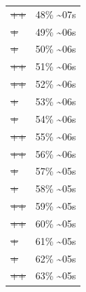 \documentclass[12pt]{article}
\begin{document}
\begin{center}
\begin{tabular}{ll}
\sout{\sout{\sout{\sout{\sout{\sout{\sout{\sout{\sout{\sout{\sout{++}}}}}}}}}}} & 48\% \textasciitilde{}07s\\
\sout{\sout{\sout{\sout{\sout{\sout{\sout{\sout{\sout{\sout{\sout{\sout{+}}}}}}}}}}}} & 49\% \textasciitilde{}06s\\
\sout{\sout{\sout{\sout{\sout{\sout{\sout{\sout{\sout{\sout{\sout{\sout{+}}}}}}}}}}}} & 50\% \textasciitilde{}06s\\
\sout{\sout{\sout{\sout{\sout{\sout{\sout{\sout{\sout{\sout{\sout{\sout{++}}}}}}}}}}}} & 51\% \textasciitilde{}06s\\
\sout{\sout{\sout{\sout{\sout{\sout{\sout{\sout{\sout{\sout{\sout{\sout{++}}}}}}}}}}}} & 52\% \textasciitilde{}06s\\
\sout{\sout{\sout{\sout{\sout{\sout{\sout{\sout{\sout{\sout{\sout{\sout{\sout{+}}}}}}}}}}}}} & 53\% \textasciitilde{}06s\\
\sout{\sout{\sout{\sout{\sout{\sout{\sout{\sout{\sout{\sout{\sout{\sout{\sout{+}}}}}}}}}}}}} & 54\% \textasciitilde{}06s\\
\sout{\sout{\sout{\sout{\sout{\sout{\sout{\sout{\sout{\sout{\sout{\sout{\sout{++}}}}}}}}}}}}} & 55\% \textasciitilde{}06s\\
\sout{\sout{\sout{\sout{\sout{\sout{\sout{\sout{\sout{\sout{\sout{\sout{\sout{++}}}}}}}}}}}}} & 56\% \textasciitilde{}06s\\
\sout{\sout{\sout{\sout{\sout{\sout{\sout{\sout{\sout{\sout{\sout{\sout{\sout{\sout{+}}}}}}}}}}}}}} & 57\% \textasciitilde{}05s\\
\sout{\sout{\sout{\sout{\sout{\sout{\sout{\sout{\sout{\sout{\sout{\sout{\sout{\sout{+}}}}}}}}}}}}}} & 58\% \textasciitilde{}05s\\
\sout{\sout{\sout{\sout{\sout{\sout{\sout{\sout{\sout{\sout{\sout{\sout{\sout{\sout{++}}}}}}}}}}}}}} & 59\% \textasciitilde{}05s\\
\sout{\sout{\sout{\sout{\sout{\sout{\sout{\sout{\sout{\sout{\sout{\sout{\sout{\sout{++}}}}}}}}}}}}}} & 60\% \textasciitilde{}05s\\
\sout{\sout{\sout{\sout{\sout{\sout{\sout{\sout{\sout{\sout{\sout{\sout{\sout{\sout{\sout{+}}}}}}}}}}}}}}} & 61\% \textasciitilde{}05s\\
\sout{\sout{\sout{\sout{\sout{\sout{\sout{\sout{\sout{\sout{\sout{\sout{\sout{\sout{\sout{+}}}}}}}}}}}}}}} & 62\% \textasciitilde{}05s\\
\sout{\sout{\sout{\sout{\sout{\sout{\sout{\sout{\sout{\sout{\sout{\sout{\sout{\sout{\sout{++}}}}}}}}}}}}}}} & 63\% \textasciitilde{}05s\\

\end{tabular}
\end{center}
\end{document}
